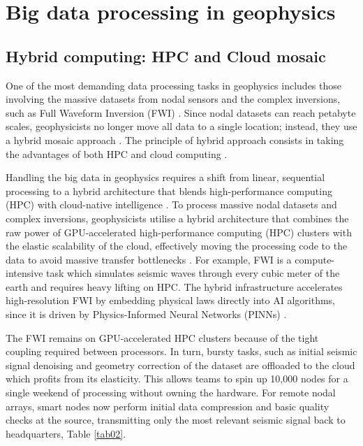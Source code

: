 \documentclass[data,article,submit,pdftex,moreauthors]{Definitions/mdpi}
\begin{document}
\section{Big data processing in geophysics}

\subsection{Hybrid computing: HPC and Cloud mosaic}
One of the most demanding data processing tasks in geophysics includes those involving the massive datasets from nodal sensors and the complex inversions, such as Full Waveform Inversion (FWI) \cite{witte2019scalable}. Since nodal datasets can reach petabyte scales, geophysicists no longer move all data to a single location; instead, they use a hybrid mosaic approach \cite{peter2011forward, wang2020cloud}. The principle of hybrid approach consists in taking the advantages of both HPC and cloud computing \cite{fox2017big, assuncao2015big}.

Handling the big data in geophysics requires a shift from linear, sequential processing to a hybrid architecture that blends high-performance computing (HPC) with cloud-native intelligence \cite{fox2017big, hashem2015rise}. To process massive nodal datasets and complex inversions, geophysicists utilise a hybrid architecture that combines the raw power of GPU-accelerated high-performance computing (HPC) clusters with the elastic scalability of the cloud, effectively moving the processing code to the data to avoid massive transfer bottlenecks \cite{wang2020cloud}. For example, FWI is a compute-intensive task which simulates seismic waves through every cubic meter of the earth and requires heavy lifting on HPC. The hybrid infrastructure accelerates high-resolution FWI by embedding physical laws directly into AI algorithms, since it is driven by Physics-Informed Neural Networks (PINNs) \cite{raissi2019physics, sun2020surrogate}.

The FWI remains on GPU-accelerated HPC clusters because of the tight coupling required between processors. In turn, bursty tasks, such as initial seismic signal denoising and geometry correction of the dataset are offloaded to the cloud which profits from its elasticity. This allows teams to spin up 10,000 nodes for a single weekend of processing without owning the hardware. For remote nodal arrays, smart nodes now perform initial data compression and basic quality checks at the source, transmitting only the most relevant seismic signal back to headquarters, Table \ref{tab02}. 
\end{document}
